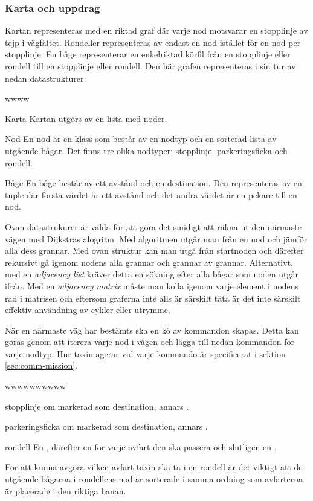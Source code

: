 \documentclass[designspec/spec.tex]{subfiles}
\begin{document}
\subsubsection{Karta och uppdrag}
Kartan representeras med en riktad graf där varje nod motsvarar en stopplinje
av tejp i vägfältet. Rondeller representeras av endast en nod istället för en
nod per stopplinje. En båge representerar en enkelriktad körfil från en
stopplinje eller rondell till en stopplinje eller rondell. Den här grafen
representeras i sin tur av nedan datastrukturer.

\begin{labeling}{wwww}
    \item[Karta] Kartan utgörs av en lista med noder.

    \item[Nod] En nod är en klass som består av en nodtyp och en sorterad lista
        av utgående bågar. Det finns tre olika nodtyper; stopplinje,
        parkeringsficka och rondell. 

    \item[Båge] En båge består av ett avstånd och en destination. Den
        representeras av en tuple där första värdet är ett avstånd och det
        andra värdet är en pekare till en nod.
\end{labeling}
Ovan datastrukurer är valda för att göra det smidigt att räkna ut den närmaste
vägen med Dijkstras alogritm. Med algoritmen utgår man från en nod och jämför
alla dess grannar. Med ovan struktur kan man utgå från startnoden och därefter
rekursivt gå igenom nodens alla grannar och grannar av grannar. Alternativt,
med en \textit{adjacency list} kräver detta en sökning efter alla bågar som
noden utgår ifrån. Med en \textit{adjacency matrix} måste man kolla igenom
varje element i nodens rad i matrisen och eftersom graferna inte alls är
särskilt täta är det inte särskilt effektiv användning av cykler eller utrymme. 

När en närmaste väg har bestämts ska en kö av kommandon skapas. Detta kan göras
genom att iterera varje nod i vägen och lägga till nedan kommandon för varje
nodtyp. Hur taxin agerar vid varje kommando är specificerat i sektion
\ref{sec:comm-mission}.
\begin{labeling}{wwwwwwwwww}
\item[stopplinje]  om markerad som destination, annars
    .
\item[parkeringsficka]  om markerad som destination,
    annars .
\item[rondell] En , därefter en  för varje avfart
    den ska passera och slutligen en .
\end{labeling}
För att kunna avgöra vilken avfart taxin ska ta i en rondell är det viktigt att
de utgående bågarna i rondellens nod är sorterade i samma ordning som
avfarterna är placerade i den riktiga banan.
\end{document}
